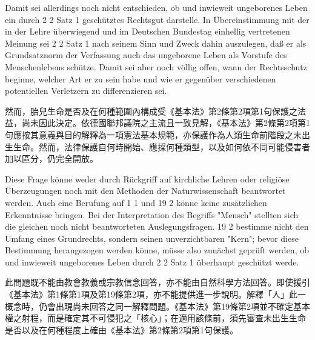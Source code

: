 \documentclass[12pt]{article}
\begin{document}
\syncleft
\begin{sourcepara}
Damit sei allerdings noch nicht entschieden, ob und inwieweit ungeborenes Leben ein durch \abbrArt{} 2 \abbrAbs{} 2 Satz 1 \abbrGG{}\ggfnArtTwoTwoOneDE{} geschütztes Rechtsgut darstelle. In Übereinstimmung mit der in der Lehre überwiegend und im Deutschen Bundestag einhellig vertretenen Meinung sei \abbrArt{} 2 \abbrAbs{} 2 Satz 1 \abbrGG{}\ggfnArtTwoTwoOneDE{} nach seinem Sinn und Zweck dahin auszulegen, daß er als Grundsatznorm der Verfassung auch das ungeborene Leben als Vorstufe des Menschenlebens schütze. Damit sei aber noch völlig offen, wann der Rechtsschutz beginne, welcher Art er zu sein habe und wie er gegenüber verschiedenen potentiellen Verletzern zu differenzieren sei.
\end{sourcepara}
\begin{transpara}
然而，胎兒生命是否及在何種範圍內構成受《基本法》第2條第2項第1句\ggfnArtTwoTwoOneZH{}保護之法益，尚未因此決定。依德國聯邦議院之主流且一致見解，《基本法》第2條第2項第1句\ggfnArtTwoTwoOneZH{}應按其意義與目的解釋為一項憲法基本規範，亦保護作為人類生命前階段之未出生生命。然而，法律保護自何時開始、應採何種類型，以及如何依不同可能侵害者加以區分，仍完全開放。
\end{transpara}

\syncleft
\begin{sourcepara}
Diese Frage könne weder durch Rückgriff auf kirchliche Lehren oder religiöse Überzeugungen noch mit den Methoden der Naturwissenschaft beantwortet werden. Auch eine Berufung auf \abbrArt{} 1 \abbrAbs{} 1 und \abbrArt{} 19 \abbrAbs{} 2 \abbrGG{}\ggfnArtOneNineteenDE{} könne keine zusätzlichen Erkenntnisse bringen. Bei der Interpretation des Begriffs "Mensch" stellten sich die gleichen noch nicht beantworteten Auslegungsfragen. \abbrArt{} 19 \abbrAbs{} 2 \abbrGG{} bestimme nicht den Umfang eines Grundrechts, sondern seinen unverzichtbaren "Kern"; bevor diese Bestimmung herangezogen werden könne, müsse also zunächst geprüft werden, ob und inwieweit ungeborenes Leben durch \abbrArt{} 2 \abbrAbs{} 2 Satz 1 \abbrGG{}\ggfnArtTwoTwoOneDE{} überhaupt geschützt werde.
\end{sourcepara}
\begin{transpara}
此問題既不能由教會教義或宗教信念回答，亦不能由自然科學方法回答。即使援引《基本法》第1條第1項及第19條第2項\ggfnArtOneNineteenZH{}，亦不能提供進一步說明。解釋「人」此一概念時，仍會出現尚未回答之同一解釋問題。《基本法》第19條第2項並不確定基本權之射程，而是確定其不可侵犯之「核心」；在適用該條前，須先審查未出生生命是否以及在何種程度上確由《基本法》第2條第2項第1句\ggfnArtTwoTwoOneZH{}保護。
\end{transpara}
\end{document}
